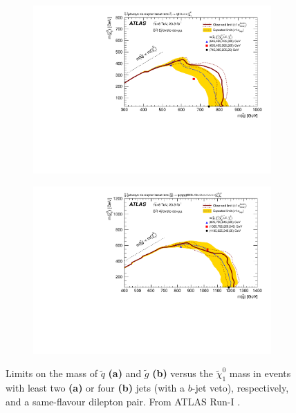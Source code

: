 \documentclass[twoside,english]{uiofysmaster}
\begin{document}
\begin{figure}[hbt]
\centering
\begin{subfigure}[b]{0.45\textwidth}
	\includegraphics[width=\textwidth]{figures/susyintro/Edge_wband1_wfixSigXSecband1_showcms0_EdgeAnalysisUnblindXsec_SR2jSF.pdf}
	\caption{ }
	\label{fig:ATLAS_neutralinogluino_a}
\end{subfigure}
\begin{subfigure}[b]{0.45\textwidth}
	\includegraphics[width=\textwidth]{figures/susyintro/Edge_wband1_wfixSigXSecband1_showcms0_EdgeAnalysisUnblindXsec_SR4jSF.pdf}
	\caption{ }
	\label{fig:ATLAS_neutralinogluino_b}
\end{subfigure}
\caption{Limits on the mass of $\tilde q$ {\bf (a)} and $\tilde g$ {\bf (b)} versus the $\tilde \chi_1^0$ mass in events with least two {\bf (a)} or four {\bf (b)} jets (with a $b$-jet veto), respectively, and a same-flavour dilepton pair. From ATLAS Run-I \cite{Aad:2015wqa}.}
\label{fig:ATLAS_neutralinogluino}
\end{figure}
\end{document}
